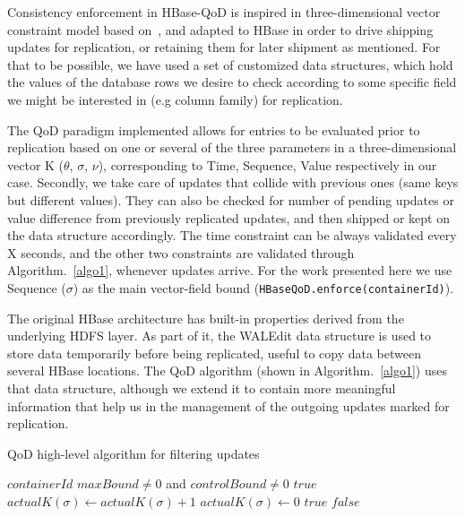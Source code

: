 Consistency enforcement in HBase-QoD is inspired in three-dimensional vector constraint model based on~\cite{Santos:2010}, and adapted to HBase in order to drive shipping updates for replication, or retaining them for later shipment as mentioned. For that to be possible, we have used a set of customized data structures, which hold the values of the database rows we desire to check according to some specific field we might be interested in (e.g column family) for replication.

The QoD paradigm implemented allows for entries to be evaluated prior to replication based on one or several of the three parameters in a three-dimensional vector K ($\theta$, $\sigma$, $\nu$), corresponding to Time, Sequence, Value respectively in our case. Secondly, we take care of updates that collide with previous ones (same keys but different values). They can also be checked for number of pending updates or value difference from previously replicated updates, and then shipped or kept on the data structure accordingly. The time constraint can be always validated every X seconds, and the other two constraints are validated through Algorithm.~\ref{algo1}, whenever updates arrive. For the work presented here we use Sequence ($\sigma$) as the main vector-field bound (\texttt{HBaseQoD.enforce(containerId)}).

The original HBase architecture has built-in properties derived from the underlying HDFS layer. As part of it, the WALEdit data structure is used to store data temporarily before being replicated, useful to copy data between several HBase locations. The QoD algorithm (shown in Algorithm.~\ref{algo1}) uses that data structure, although we extend it to contain more meaningful information that help us in the management of the outgoing updates marked for replication.

\begin{algorithm*}
\caption{QoD high-level algorithm for filtering updates}
\label{algo1}
\begin{algorithmic}[1]
\REQUIRE $containerId$
\ENSURE $maxBound \neq 0$ and $controlBound \neq 0$
\RETURN $true$
\STATE $actualK(\sigma) \leftarrow actualK(\sigma)+1$
	\STATE $actualK(\sigma) \leftarrow 0$
	\RETURN $true$
	\ELSE
	\RETURN $false$
	\ENDIF
\ENDIF
\ENDWHILE
\end{algorithmic}
\end{algorithm*}

